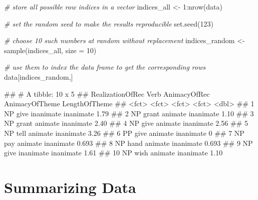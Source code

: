 \documentclass[
]{book}
\newenvironment{Shaded}{\begin{snugshade}}{\end{snugshade}}
\newcommand{\AttributeTok}[1]{\textcolor[rgb]{0.77,0.63,0.00}{#1}}
\newcommand{\CommentTok}[1]{\textcolor[rgb]{0.56,0.35,0.01}{\textit{#1}}}
\newcommand{\DecValTok}[1]{\textcolor[rgb]{0.00,0.00,0.81}{#1}}
\newcommand{\FunctionTok}[1]{\textcolor[rgb]{0.00,0.00,0.00}{#1}}
\newcommand{\NormalTok}[1]{#1}
\newcommand{\OtherTok}[1]{\textcolor[rgb]{0.56,0.35,0.01}{#1}}
\newcommand{\SpecialCharTok}[1]{\textcolor[rgb]{0.00,0.00,0.00}{#1}}
\begin{document}
\begin{Shaded}
\begin{Highlighting}[]
\CommentTok{\# store all possible row indices in a vector}
\NormalTok{indices\_all }\OtherTok{\textless{}{-}} \DecValTok{1}\SpecialCharTok{:}\FunctionTok{nrow}\NormalTok{(data)}

\CommentTok{\# set the random seed to make the results reproducible}
\FunctionTok{set.seed}\NormalTok{(}\DecValTok{123}\NormalTok{)}

\CommentTok{\# choose 10 such numbers at random without replacement}
\NormalTok{indices\_random }\OtherTok{\textless{}{-}} \FunctionTok{sample}\NormalTok{(indices\_all, }\AttributeTok{size =} \DecValTok{10}\NormalTok{)}

\CommentTok{\# use them to index the data frame to get the corresponding rows}
\NormalTok{data[indices\_random,]}
\end{Highlighting}
\end{Shaded}

\begin{Shaded}
\begin{Highlighting}[]
\NormalTok{\#\# \# A tibble: 10 x 5}
\NormalTok{\#\#    RealizationOfRec Verb  AnimacyOfRec AnimacyOfTheme LengthOfTheme}
\NormalTok{\#\#    \textless{}fct\textgreater{}            \textless{}fct\textgreater{} \textless{}fct\textgreater{}        \textless{}fct\textgreater{}                  \textless{}dbl\textgreater{}}
\NormalTok{\#\#  1 NP               give  inanimate    inanimate              1.79 }
\NormalTok{\#\#  2 NP               grant animate      inanimate              1.10 }
\NormalTok{\#\#  3 NP               grant animate      inanimate              2.40 }
\NormalTok{\#\#  4 NP               give  animate      inanimate              2.56 }
\NormalTok{\#\#  5 NP               tell  animate      inanimate              3.26 }
\NormalTok{\#\#  6 PP               give  animate      inanimate              0    }
\NormalTok{\#\#  7 NP               pay   animate      inanimate              0.693}
\NormalTok{\#\#  8 NP               hand  animate      inanimate              0.693}
\NormalTok{\#\#  9 NP               give  inanimate    inanimate              1.61 }
\NormalTok{\#\# 10 NP               wish  animate      inanimate              1.10}
\end{Highlighting}
\end{Shaded}

\hypertarget{summarizing-data}{%
\section{Summarizing Data}\label{summarizing-data}}
\end{document}

